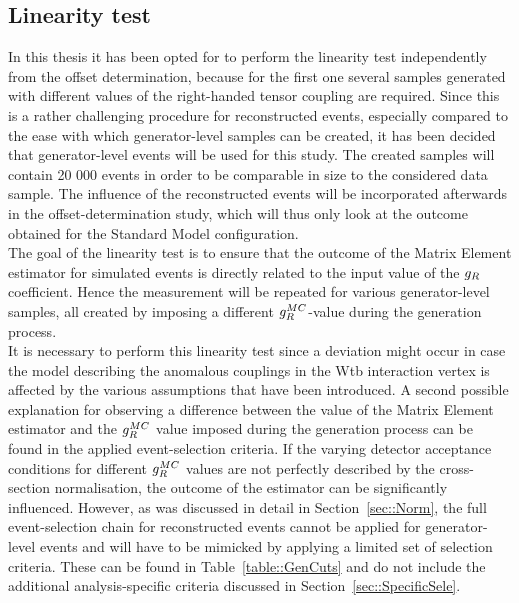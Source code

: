 \subsection{Linearity test}

In this thesis it has been opted for to perform the linearity test independently from the offset determination, because for the first one several samples generated with different values of the right-handed tensor coupling are required.
Since this is a rather challenging procedure for reconstructed events, especially compared to the ease with which generator-level samples can be created, it has been decided that generator-level events will be used for this study. The created samples will contain 20 000 events in order to be comparable in size to the considered data sample.
The influence of the reconstructed events will be incorporated afterwards in the offset-determination study, which will thus only look at the outcome obtained for the Standard Model configuration.
\\

The goal of the linearity test is to ensure that the outcome of the Matrix Element estimator for simulated events is directly related to the input value of the $g_{R}$ coefficient.
Hence the measurement will be repeated for various generator-level samples, all created by imposing a different $g_{R}^{MC}$-value during the generation process.
\\
It is necessary to perform this linearity test since a deviation might occur in case the model describing the anomalous couplings in the Wtb interaction vertex is affected by the various assumptions that have been introduced.
A second possible explanation for observing a difference between the value of the Matrix Element estimator and the $g_{R}^{MC}$ value imposed during the generation process can be found in the applied event-selection criteria.
If the varying detector acceptance conditions for different $g_{R}^{MC}$ values are not perfectly described by the cross-section normalisation, the outcome of the estimator can be significantly influenced.
However, as was discussed in detail in Section~\ref{sec::Norm}, the full event-selection chain for reconstructed events cannot be applied for generator-level events and will have to be mimicked by applying a limited set of selection criteria. These can be found in Table~\ref{table::GenCuts} and do not include the additional analysis-specific criteria discussed in Section~\ref{sec::SpecificSele}.
\\

